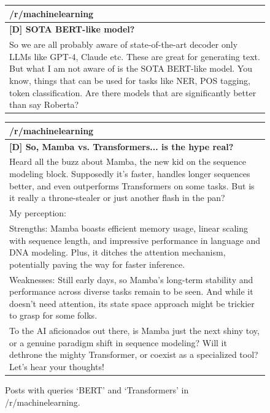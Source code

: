     \FloatBarrier
    \begin{figure}[ht]
        \begin{minipage}[t]{0.45\textwidth}
            \centering
            \begin{tabular}{|p{7cm}|}
                \hline
                \textbf{/r/machinelearning} \\
                \hline
                \textbf{[D] SOTA BERT-like model?} \\
                \hline
                So we are all probably aware of state-of-the-art decoder only LLMs like GPT-4, Claude etc. These are great for generating text. But what I am not aware of is the SOTA BERT-like model. You know, things that can be used for tasks like NER, POS tagging, token classification. Are there models that are significantly better than say Roberta? \\
                \hline
            \end{tabular}
        \end{minipage}
        \hfill
        \begin{minipage}[t]{0.45\textwidth}
            \centering
            \begin{tabular}{|p{7cm}|}
                \hline
                \textbf{/r/machinelearning} \\
                \hline
                \textbf{[D] So, Mamba vs. Transformers... is the hype real?} \\
                \hline
                Heard all the buzz about Mamba, the new kid on the sequence modeling block. Supposedly it's faster, handles longer sequences better, and even outperforms Transformers on some tasks. But is it really a throne-stealer or just another flash in the pan? \\
                My perception: \\
                Strengths: Mamba boasts efficient memory usage, linear scaling with sequence length, and impressive performance in language and DNA modeling. Plus, it ditches the attention mechanism, potentially paving the way for faster inference. \\
                Weaknesses: Still early days, so Mamba's long-term stability and performance across diverse tasks remain to be seen. And while it doesn't need attention, its state space approach might be trickier to grasp for some folks. \\
                To the AI aficionados out there, is Mamba just the next shiny toy, or a genuine paradigm shift in sequence modeling? Will it dethrone the mighty Transformer, or coexist as a specialized tool? Let's hear your thoughts! \\
                \hline
            \end{tabular}
        \end{minipage}
        \caption{Posts with queries `BERT' and `Transformers' in /r/machinelearning.}
        \label{fig:reddit_posts}
    \end{figure}
    \FloatBarrier

